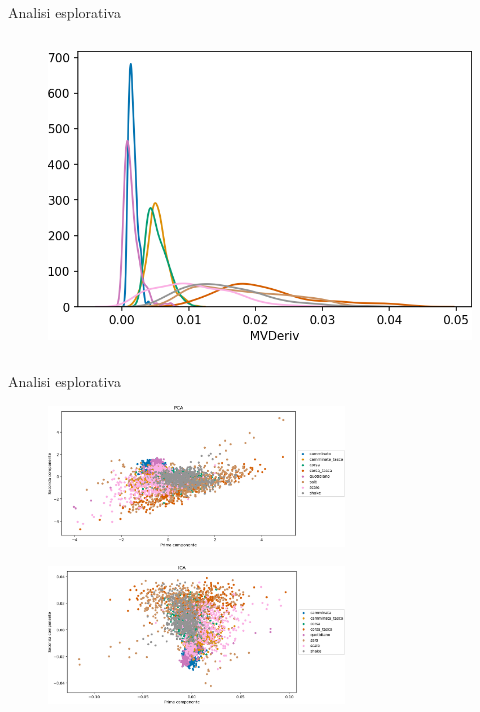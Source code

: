 \documentclass{beamer}
\begin{document}
\begin{frame}{Analisi esplorativa}
\begin{columns}[T]
\begin{column}{.33\textwidth}
\begin{figure}[H]
\end{figure}
\begin{figure}[H]
\includegraphics[width=\textwidth]{../figure/MVDeriv.png}
\end{figure}
\end{column}%
\end{columns}
\end{frame}


\begin{frame}{Analisi esplorativa}
\begin{figure}[H]
\includegraphics[width=0.7\textwidth]{../figure/PCA.png}
\end{figure}
\begin{figure}[H]
\includegraphics[width=0.7\textwidth]{../figure/ICA.png}
\end{figure}
\end{frame}
\end{document}
